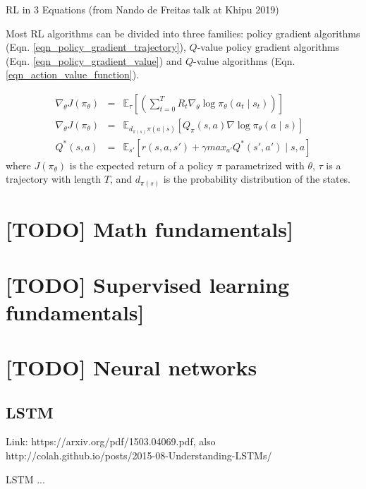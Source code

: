 \documentclass[12pt, english]{article}
\begin{document}
RL in 3 Equations (from Nando de Freitas talk at Khipu 2019)

Most RL algorithms can be divided into three families: policy gradient algorithms (Eqn. \ref{eqn_policy_gradient_trajectory}), $Q$-value policy gradient algorithms (Eqn. \ref{eqn_policy_gradient_value}) and $Q$-value algorithms (Eqn. \ref{eqn_action_value_function}).

\begin{eqnarray}
  \nabla_\theta J(\pi_\theta) &=& \mathbb{E}_\tau [(\sum_{t=0}^T R_t \nabla_\theta \log \pi_\theta (a_t \mid s_t))] \label{eqn_policy_gradient_trajectory} \\
  \nabla_\theta J(\pi_\theta) &=& \mathbb{E}_{d_{\pi(s)} \pi(a \mid s)} [Q_\pi(s,a) \nabla \log \pi_\theta (a \mid s)] \label{eqn_policy_gradient_value}\\
  Q^*(s,a) &=& \mathbb{E}_{s'} [r(s,a,s') + \gamma max_{a'} Q^*(s',a') \mid s,a] \label{eqn_action_value_function}
\end{eqnarray}
%
where $J(\pi_\theta)$ is the expected return of a policy $\pi$ parametrized with $\theta$, $\tau$ is a trajectory with length $T$, and $d_{\pi(s)}$ is the probability distribution of the states.

\newpage

\tableofcontents

\newpage

\section{[TODO] Math fundamentals]}

\section{[TODO] Supervised learning fundamentals]}

\section{[TODO] Neural networks}

\subsection{LSTM}

Link: https://arxiv.org/pdf/1503.04069.pdf, also http://colah.github.io/posts/2015-08-Understanding-LSTMs/

LSTM \cite{hochreiter_long_1997} \cite{greff_lstm_2017} ...
\end{document}
